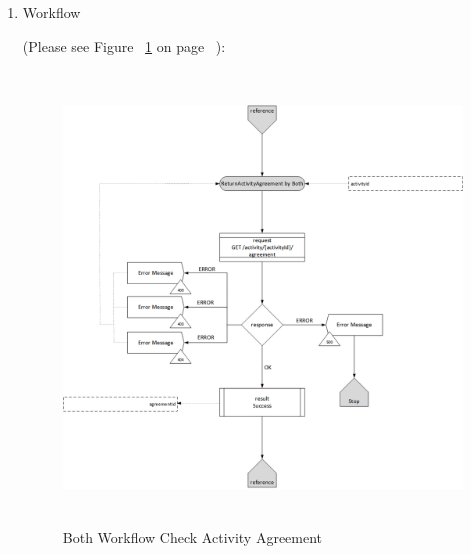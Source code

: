 \begin{enumerate}
\item Workflow

(Please see Figure ~\ref{fig:BCAA} on page ~\pageref{fig:BCAA}):

\begin{figure}[H]
    \centering
    \includegraphics[width=12cm,height=12cm,angle=0]{./diag/Workflow/Activity/ReturnActivityAgreement-B-Workflow.png}
    \caption{Both Workflow Check Activity Agreement }
	\label{fig:BCAA}
\end{figure}


\end{enumerate}

\newpage




